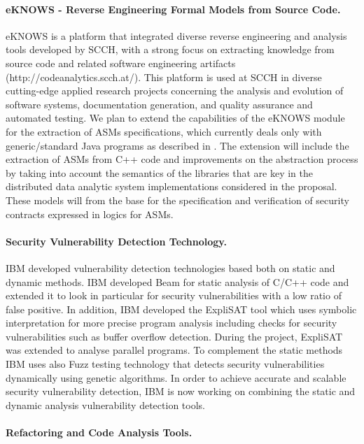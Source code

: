 \documentclass[a4paper,11pt]{article}
\begin{document}
\paragraph{\SCCHshort{} eKNOWS - Reverse Engineering Formal Models from Source Code.}
eKNOWS is a platform that integrated diverse reverse engineering and analysis tools developed by SCCH, with a strong focus on extracting knowledge from source code and related software engineering artifacts (http://codeanalytics.scch.at/). This platform is used at SCCH in diverse cutting-edge applied research projects concerning the analysis and evolution of software systems, documentation generation, and quality assurance and automated testing. 
We plan to extend the capabilities of the eKNOWS module for the extraction of ASMs specifications, which currently deals only with generic/standard Java programs as described in \cite{FerrarottiMP20,FerrarottiPMB19}. The extension will include the extraction of ASMs from C++ code and improvements on the abstraction process by taking into account the semantics of the libraries that are key in the distributed data analytic system implementations considered in the proposal. These models will from the base for the specification and verification of security contracts expressed in logics for ASMs.  

\paragraph{\IBM{} Security Vulnerability Detection Technology.}

IBM developed vulnerability detection technologies based both on static and dynamic methods. IBM developed Beam for static analysis of C/C++ code and extended it to look in particular for security vulnerabilities with a low ratio of false positive. In addition, IBM developed the ExpliSAT tool which uses symbolic interpretation for more precise program analysis including checks for security vulnerabilities such as buffer overflow detection. During the \rephrase{} project, ExpliSAT was extended to analyse parallel programs. To complement the static methods IBM uses also Fuzz testing technology that detects security vulnerabilities dynamically using genetic algorithms. In order to achieve accurate and scalable security vulnerability detection, IBM is now working on combining the static and dynamic analysis vulnerability detection tools.     

\paragraph{\SAshort{} \paraformance Refactoring and Code Analysis Tools.}
\end{document}
